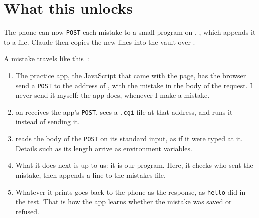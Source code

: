 \documentclass[11pt,a4paper]{article}
\newcommand{\yuanyi}{\toneD{願}\toneD{意}}
\newcommand{\yuanyin}{\toneB{原}\toneA{因}}
\begin{document}
\section{What this unlocks}

The phone can now \texttt{POST} each mistake to a small program on , , which appends it to a file. Claude then copies the new lines into the vault over .

A mistake travels like this~\cite[\textit{Writing CGI Scripts in Python}, p.~1128]{lutz}:

\begin{center}
\end{center}

\begin{enumerate}[leftmargin=1.5em]
  \item The practice app, the JavaScript that came with the page, has the browser send a \texttt{POST} to the address of , with the mistake in the body of the request. I never send it myself: the app does, whenever I make a mistake.
  \item {} on  receives the app's \texttt{POST}, sees a \texttt{.cgi} file at that address, and runs it instead of sending it.
  \item {} reads the body of the \texttt{POST} on its standard input, as if it were typed at it. Details such as its length arrive as environment variables.
  \item What it does next is up to us: it is our program. Here, it checks who sent the mistake, then appends a line to the mistakes file.
  \item Whatever it prints goes back to the phone as the response, as \texttt{hello} did in the test. That is how the app learns whether the mistake was saved or refused.
\end{enumerate}
\end{document}
